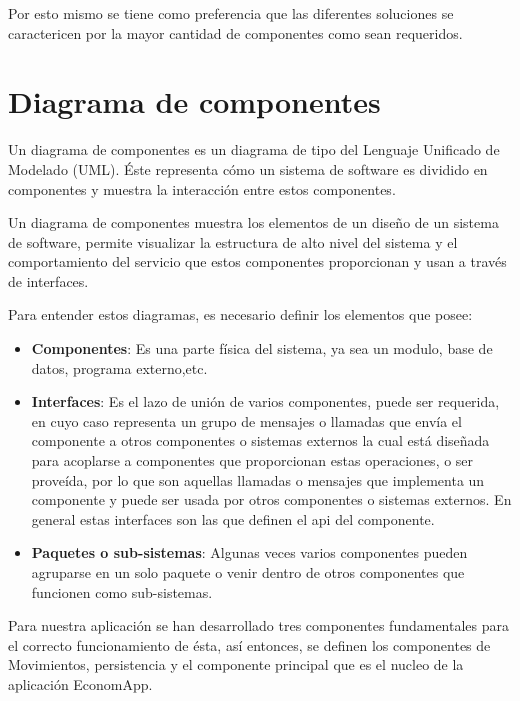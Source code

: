 Por esto mismo se tiene como preferencia que las diferentes soluciones se caractericen por la mayor cantidad de componentes como sean requeridos.

\section{Diagrama de componentes}

Un diagrama de componentes es un diagrama de tipo del Lenguaje Unificado de Modelado (UML). Éste representa cómo un sistema de software es dividido en componentes y muestra la interacción entre estos componentes.

Un diagrama de componentes muestra los elementos de un diseño de un sistema de software, permite visualizar la estructura de alto nivel del sistema y el comportamiento del servicio que estos componentes proporcionan y usan a través de interfaces\cite{Pw7DC}.

Para entender estos diagramas, es necesario definir los elementos que posee:
\begin{itemize}
	\item \textbf{Componentes}: Es una parte física del sistema, ya sea un modulo, base de datos, programa externo,etc. 
	\item \textbf{Interfaces}: Es el lazo de unión de varios componentes, puede ser requerida, en cuyo caso representa un grupo de mensajes o llamadas que envía el componente a otros componentes o sistemas externos la cual está diseñada para acoplarse a componentes que proporcionan estas operaciones, o ser proveída, por lo que son aquellas llamadas o mensajes que implementa un componente y puede ser usada por otros componentes o sistemas externos. En general estas interfaces son las que definen el api del componente.
	\item \textbf{Paquetes o sub-sistemas}: Algunas veces varios componentes pueden agruparse en un solo paquete o venir dentro de otros componentes que funcionen como sub-sistemas.
\end{itemize} 

Para nuestra aplicación se han desarrollado tres componentes fundamentales para el correcto funcionamiento de ésta, así entonces, se definen los componentes de Movimientos, persistencia y el componente principal que es el nucleo de la aplicación EconomApp.

